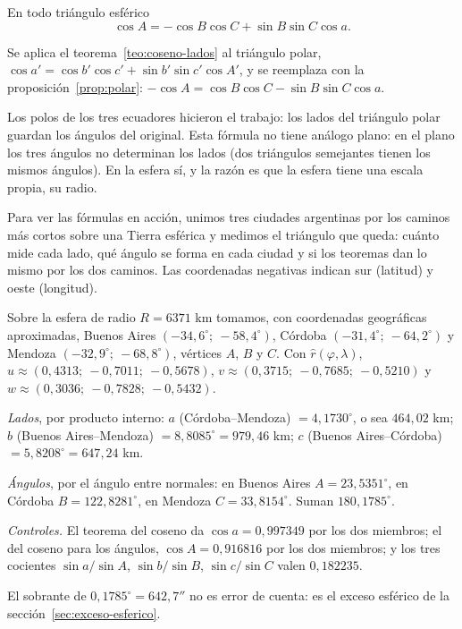 \begin{teorema}\label{teo:coseno-angulos}
En todo triángulo esférico
\[
  \cos A=-\cos B\cos C+\sin B\sin C\cos a .
\]
\end{teorema}

\begin{demostracion}
Se aplica el teorema~\ref{teo:coseno-lados} al triángulo polar,
\(\cos a'=\cos b'\cos c'+\sin b'\sin c'\cos A'\), y se reemplaza con la
proposición~\ref{prop:polar}: \(-\cos A=\cos B\cos C-\sin B\sin C\cos a\).
\end{demostracion}

Los polos de los tres ecuadores hicieron el trabajo: los lados del triángulo polar guardan los
ángulos del original. Esta fórmula no tiene análogo plano: en el plano los tres ángulos no
determinan los lados (dos triángulos semejantes tienen los mismos ángulos). En la esfera sí,
y la razón es que la esfera tiene una escala propia, su radio.

Para ver las fórmulas en acción, unimos tres ciudades argentinas por los caminos más cortos
sobre una Tierra esférica y medimos el triángulo que queda: cuánto mide cada lado, qué ángulo
se forma en cada ciudad y si los teoremas dan lo mismo por los dos caminos. Las coordenadas
negativas indican sur (latitud) y oeste (longitud).

\begin{ejemplo}\label{ej:esfera-tres-ciudades}
Sobre la esfera de radio \(R=6371\) km tomamos, con coordenadas geográficas aproximadas,
Buenos Aires \((-34{,}6^\circ;\ -58{,}4^\circ)\), Córdoba \((-31{,}4^\circ;\ -64{,}2^\circ)\) y
Mendoza \((-32{,}9^\circ;\ -68{,}8^\circ)\), vértices \(A\), \(B\) y \(C\). Con
\(\hat r(\varphi,\lambda)\), \(u\approx(0{,}4313;\ -0{,}7011;\ -0{,}5678)\),
\(v\approx(0{,}3715;\ -0{,}7685;\ -0{,}5210)\) y \(w\approx(0{,}3036;\ -0{,}7828;\ -0{,}5432)\).

\emph{Lados}, por producto interno: \(a\) (Córdoba--Mendoza) \(=4{,}1730^\circ\), o sea
\(464{,}02\) km; \(b\) (Buenos Aires--Mendoza) \(=8{,}8085^\circ=979{,}46\) km; \(c\) (Buenos
Aires--Córdoba) \(=5{,}8208^\circ=647{,}24\) km.

\emph{Ángulos}, por el ángulo entre normales: en Buenos Aires \(A=23{,}5351^\circ\), en
Córdoba \(B=122{,}8281^\circ\), en Mendoza \(C=33{,}8154^\circ\). Suman \(180{,}1785^\circ\).

\emph{Controles.} El teorema del coseno da \(\cos a=0{,}997349\) por los dos miembros; el del
coseno para los ángulos, \(\cos A=0{,}916816\) por los dos miembros; y los tres cocientes
\(\sin a/\sin A\), \(\sin b/\sin B\), \(\sin c/\sin C\) valen \(0{,}182235\).

El sobrante de \(0{,}1785^\circ=642{,}7''\) no es error de cuenta: es el exceso esférico de
la sección~\ref{sec:exceso-esferico}.
\end{ejemplo}

